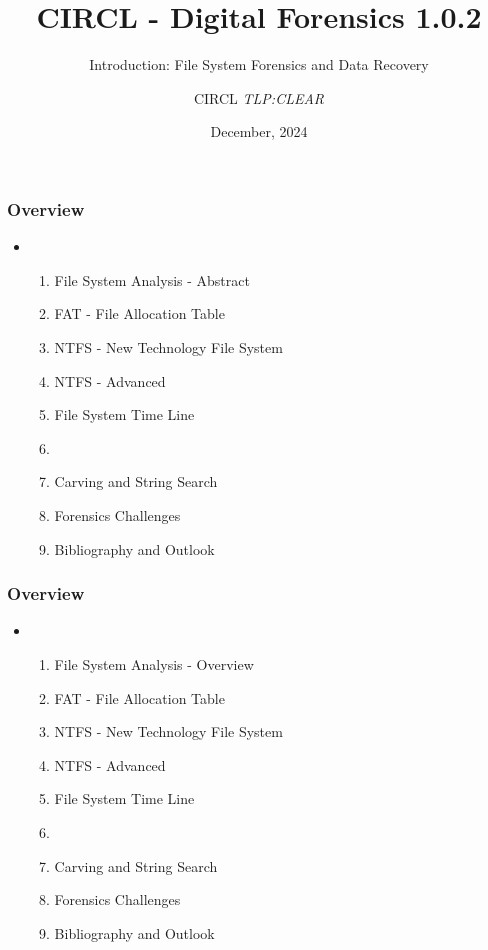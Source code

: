 \documentclass{beamer}
\author{CIRCL \emph{TLP:CLEAR}}
\title{CIRCL - Digital Forensics 1.0.2}
\subtitle{Introduction: File System Forensics and Data Recovery}
\institute{info@circl.lu}
\date{December, 2024}
\begin{document}
\begin{frame}[t,plain]
\titlepage
\end{frame}


\begin{frame}
  \frametitle{Overview}
  \begin{itemize}
  \item[]
      \begin{enumerate}
          \item File System Analysis - Abstract
          \item FAT - File Allocation Table
          \item NTFS - New Technology File System
          \item NTFS - Advanced
          \item File System Time Line
          \item 
          \item Carving and String Search
          \item Forensics Challenges
          \item Bibliography and Outlook
      \end{enumerate}
  \end{itemize}
\end{frame}












\begin{frame}
  \frametitle{Overview}
  \begin{itemize}
  \item[]
      \begin{enumerate}
          \item File System Analysis - Overview
          \item FAT - File Allocation Table
          \item NTFS - New Technology File System
          \item NTFS - Advanced
          \item File System Time Line
          \item 
          \item Carving and String Search
          \item Forensics Challenges
          \item Bibliography and Outlook
      \end{enumerate}
  \end{itemize}
\end{frame}
\end{document}
